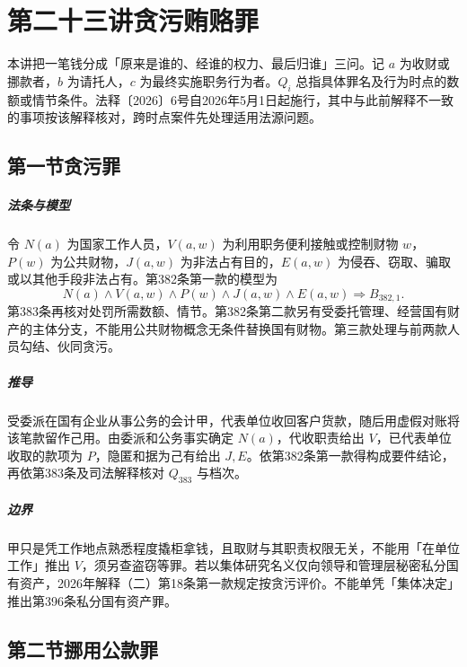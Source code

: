 \chapter{第二十三讲\quad 贪污贿赂罪}
\label{lecture:23}
\par

本讲把一笔钱分成「原来是谁的、经谁的权力、最后归谁」三问。记 \(a\) 为收财或挪款者，\(b\) 为请托人，\(c\) 为最终实施职务行为者。\(Q_i\) 总指具体罪名及行为时点的数额或情节条件。法释〔2026〕6号自2026年5月1日起施行，其中与此前解释不一致的事项按该解释核对，跨时点案件先处理适用法源问题。

\section{第一节\quad 贪污罪}

\paragraph{法条与模型}
令 \(N(a)\) 为国家工作人员，\(V(a,w)\) 为利用职务便利接触或控制财物 \(w\)，\(P(w)\) 为公共财物，\(J(a,w)\) 为非法占有目的，\(E(a,w)\) 为侵吞、窃取、骗取或以其他手段非法占有。第382条第一款的模型为
\[
N(a)\land V(a,w)\land P(w)\land J(a,w)\land E(a,w)
\Longrightarrow B_{382,1}.
\]
第383条再核对处罚所需数额、情节。第382条第二款另有受委托管理、经营国有财产的主体分支，不能用公共财物概念无条件替换国有财物。第三款处理与前两款人员勾结、伙同贪污。

\paragraph{推导}
受委派在国有企业从事公务的会计甲，代表单位收回客户货款，随后用虚假对账将该笔款留作己用。由委派和公务事实确定 \(N(a)\)，代收职责给出 \(V\)，已代表单位收取的款项为 \(P\)，隐匿和据为己有给出 \(J,E\)。依第382条第一款得构成要件结论，再依第383条及司法解释核对 \(Q_{383}\) 与档次。

\paragraph{边界}
甲只是凭工作地点熟悉程度撬柜拿钱，且取财与其职责权限无关，不能用「在单位工作」推出 \(V\)，须另查盗窃等罪。若以集体研究名义仅向领导和管理层秘密私分国有资产，2026年解释（二）第18条第一款规定按贪污评价。不能单凭「集体决定」推出第396条私分国有资产罪。

\section{第二节\quad 挪用公款罪}

